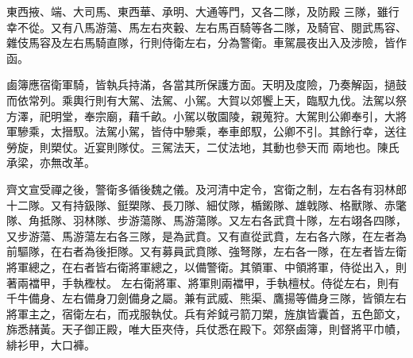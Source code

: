 \begin{pinyinscope}
 東西掖、端、大司馬、東西華、承明、大通等門，又各二隊，及防殿
 三隊，雖行幸不從。又有八馬游蕩、馬左右夾轂、左右馬百騎等各二隊，及騎官、閱武馬容、雜伎馬容及左右馬騎直隊，行則侍衛左右，分為警衛。車駕晨夜出入及涉險，皆作函。



 鹵簿應宿衛軍騎，皆執兵持滿，各當其所保護方面。天明及度險，乃奏解函，撾鼓而依常列。乘輿行則有大駕、法駕、小駕。大賀以郊饗上天，臨馭九伐。法駕以祭方澤，祀明堂，奉宗廟，藉千畝。小駕以敬園陵，親蒐狩。大駕則公卿奉引，大將軍驂乘，太搢馭。法駕小駕，皆侍中驂乘，奉車郎馭，公卿不引。其餘行幸，送往勞旋，則槊仗。近宴則隊仗。三駕法天，二仗法地，其動也參天而
 兩地也。陳氏承梁，亦無改革。



 齊文宣受禪之後，警衛多循後魏之儀。及河清中定令，宮衛之制，左右各有羽林郎十二隊。又有持鈒隊、鋌槊隊、長刀隊、細仗隊，楯鎩隊、雄戟隊、格獸隊、赤氅隊、角抵隊、羽林隊、步游蕩隊、馬游蕩隊。又左右各武賁十隊，左右翊各四隊，又步游蕩、馬游蕩左右各三隊，是為武賁。又有直從武賁，左右各六隊，在左者為前驅隊，在右者為後拒隊。又有募員武賁隊、強弩隊，左右各一隊，在左者皆左衛將軍總之，在右者皆右衛將軍總之，以備警衛。其領軍、中領將軍，侍從出入，則著兩襠甲，手執檉杖。
 左右衛將軍、將軍則兩襠甲，手執檀杖。侍從左右，則有千牛備身、左右備身刀劍備身之屬。兼有武威、熊渠、鷹揚等備身三隊，皆領左右將軍主之，宿衛左右，而戎服執仗。兵有斧鉞弓箭刀槊，旌旗皆囊首，五色節文，旆悉赭黃。天子御正殿，唯大臣夾侍，兵仗悉在殿下。郊祭鹵簿，則督將平巾幘，緋衫甲，大口褲。




\end{pinyinscope}
